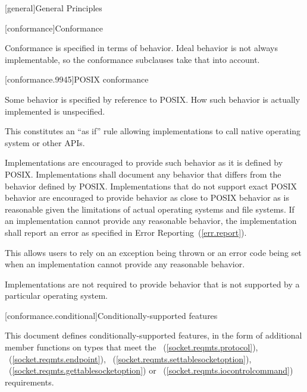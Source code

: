 
[general]{General Principles}

[conformance]{Conformance}

\pnum
 Conformance is specified in terms of behavior. Ideal behavior is not always implementable, so the conformance subclauses take that into account.


[conformance.9945]{POSIX conformance}

\pnum
 Some behavior is specified by reference to POSIX. How such behavior is actually implemented is unspecified.

\pnum
 \begin{note} This constitutes an ``as if'' rule allowing implementations to call native operating system or other APIs. \end{note}

\pnum
Implementations are encouraged to provide such behavior as it is defined by POSIX. Implementations shall document any behavior that differs from the behavior defined by POSIX. Implementations that do not support exact POSIX behavior are encouraged to provide behavior as close to POSIX behavior as is reasonable given the limitations of actual operating systems and file systems. If an implementation cannot provide any reasonable behavior, the implementation shall report an error as specified in Error Reporting~(\ref{err.report}).

\pnum
 \begin{note} This allows users to rely on an exception being thrown or an error code being set when an implementation cannot provide any reasonable behavior. \end{note}

\pnum
 Implementations are not required to provide behavior that is not supported by a particular operating system.



[conformance.conditional]{Conditionally-supported features}

\pnum
This document defines conditionally-supported features, in the form of additional member functions on types that meet the ~(\ref{socket.reqmts.protocol}), ~(\ref{socket.reqmts.endpoint}), ~(\ref{socket.reqmts.settablesocketoption}), ~(\ref{socket.reqmts.gettablesocketoption}) or ~(\ref{socket.reqmts.iocontrolcommand}) requirements.


